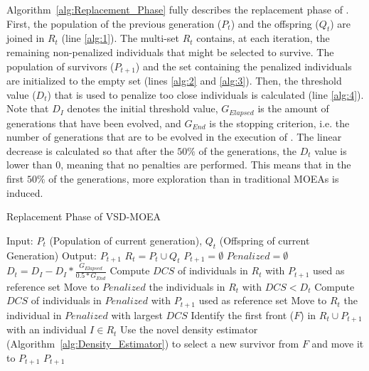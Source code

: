 Algorithm~\ref{alg:Replacement_Phase} fully describes the replacement phase of \VSDMOEA{}.
%
First, the population of the previous generation ($P_t$) and the offspring ($Q_t$) are joined
in $R_t$ (line \ref{alg:1}).
%
The multi-set $R_t$ contains, at each iteration, the remaining non-penalized individuals that might be selected 
to survive.
%
The population of survivors ($P_{t+1}$) and the set containing the penalized individuals are initialized to
the empty set (lines \ref{alg:2} and \ref{alg:3}).
%
Then, the threshold value ($D_t$) that is used to penalize too close individuals is calculated (line \ref{alg:4}).
%
Note that $D_I$ denotes the initial threshold value, $G_{Elapsed}$ is the amount of generations that have 
been evolved, and $G_{End}$ is the stopping criterion, i.e. the number of generations that are to be evolved 
in the execution of \VSDMOEA{}.
%
The linear decrease is calculated so that after the $50\%$ of the generations, the $D_t$ value is lower than 0, 
meaning that no penalties are performed.
%
This means that in the first $50\%$ of the generations, more exploration than in traditional MOEAs is induced.
%

\begin{algorithm}[t]
	\caption{Replacement Phase of VSD-MOEA} 
\begin{small}
\begin{algorithmic}[1]
\STATE Input: $P_t$ (Population of current generation), $Q_t$ (Offspring of current Generation)
    	\STATE Output: $P_{t+1}$ 
        \STATE $R_t = P_t \cup Q_t$ \label{alg:1}
        \STATE $P_{t+1} = \emptyset$ \label{alg:2}
        \STATE $Penalized = \emptyset$ \label{alg:3}
				\STATE $D_t = D_I - D_I * \frac{G_{Elapsed}}{0.5*G_{End}}$ \label{alg:4}
         \label{alg:6}
					\STATE Compute $DCS$ of individuals in $R_t$ with $P_{t+1}$ used as reference set \label{alg:7}
					\STATE Move to $Penalized$ the individuals in $R_t$ with $DCS < D_t$  \label{alg:8}
        	 \label{alg:9}
						\STATE Compute $DCS$ of individuals in $Penalized$ with $P_{t+1}$ used as reference set \label{alg:10}
						\STATE Move to $R_t$ the individual in $Penalized$ with largest $DCS$ \label{alg:11}
        	\ENDIF
					\STATE Identify the first front ($F$) in $R_t \cup P_{t+1}$ with an individual $I \in R_t$ \label{alg:12}
					\STATE Use the novel density estimator (Algorithm~\ref{alg:Density_Estimator}) to select a new survivor 
					from $F$ and move it to $P_{t+1}$\label{alg:13}
        \ENDWHILE
    	\RETURN $P_{t+1}$ \label{alg:14}
	\end{algorithmic}
\end{small}
\label{alg:Replacement_Phase}
\end{algorithm}

